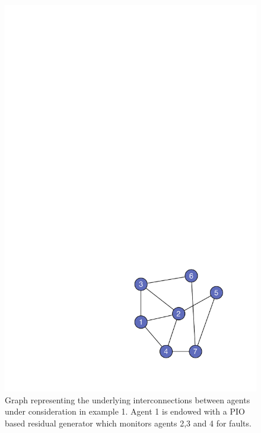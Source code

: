 \documentclass[letterpaper, 11 pt, conference]{ieeeconf}  %
\begin{document}
\begin{figure}
    \centering
    \includegraphics[scale=0.5]{images/CCTA.pdf}
    \caption{Graph representing the underlying interconnections between agents under consideration in example 1. Agent 1 is endowed with a PIO based residual generator which monitors agents 2,3 and 4 for faults.}
    \label{fig:graph}
\end{figure}
\end{document}
